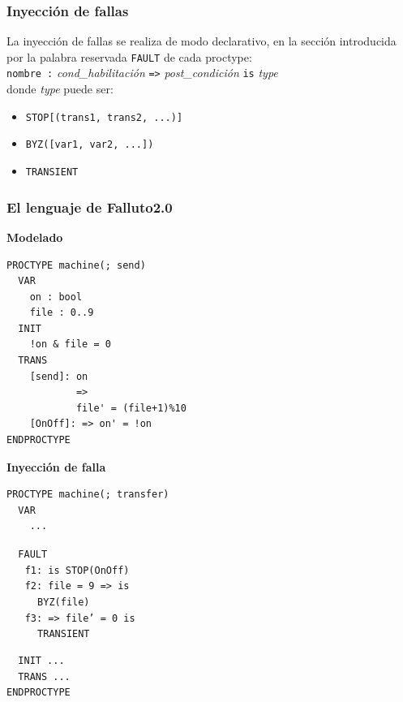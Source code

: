 \documentclass[serif]{beamer}
\begin{document}
\begin{frame}
\frametitle{Inyección de fallas}
La inyección de fallas se realiza de modo declarativo, en la 
sección introducida por la palabra reservada \texttt{FAULT} de 
cada proctype:\\[0.5cm]
\texttt{nombre :} \textit{cond\_habilitaci\'on} \texttt{=>} \textit{post\_condición} \texttt{is} \textit{type} \\[0.5cm]
donde \textit{type} puede ser: \\[0.5cm]
\begin{itemize}\item \texttt{STOP[(trans1, trans2, ...)]}
\item \texttt{BYZ([var1, var2, ...])}
\item \texttt{TRANSIENT}
\end{itemize}
\end{frame}


\begin{frame}[fragile]
\frametitle{El lenguaje de Falluto2.0}
{\fontsize{7pt}{10pt}\selectfont
\begin{minipage}{0.45\textwidth}
{\large \bfseries Modelado}
\begin{framed} 
\begin{verbatim}
PROCTYPE machine(; send)
  VAR
    on : bool
    file : 0..9
  INIT
    !on & file = 0
  TRANS
    [send]: on 
            => 
            file' = (file+1)%10
    [OnOff]: => on' = !on
ENDPROCTYPE
\end{verbatim}
\end{framed}
\end{minipage}
\hspace{0.04\textwidth}
\begin{minipage}{0.45\textwidth}
{\large \bfseries Inyección de falla}
\begin{framed}
\begin{verbatim}
PROCTYPE machine(; transfer)
  VAR
    ...
\end{verbatim}
\texttt{\color{red}~~FAULT\\$~~~~~$
f1: is STOP(OnOff)\\$~~~~~$
f2: file = 9 => is\\$~~~~~~~~~~$ BYZ(file)\\$~~~~~$
f3: => file' = 0 is\\$~~~~~~~~~~$ TRANSIENT}
\begin{verbatim}
  INIT ...
  TRANS ...
ENDPROCTYPE
\end{verbatim}
\end{framed}
\end{minipage}
} %

\end{frame}
\end{document}
